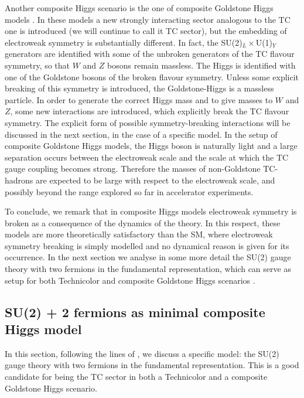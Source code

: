 Another composite Higgs scenario is the one of composite Goldstone Higgs models \cite{Kaplan:1983sm,Kaplan:1983fs}. In these models a new strongly interacting sector analogous to the TC one is introduced (we will continue to call it TC sector), but the embedding of electroweak symmetry is substantially different. In fact, the SU(2)$_L\times$U(1)$_Y$ generators are identified with some of the unbroken generators of the TC flavour symmetry, so that $W$ and $Z$ bosons remain massless. The Higgs is identified with one of the Goldstone bosons of the broken flavour symmetry. Unless some explicit breaking of this symmetry is introduced, the Goldstone-Higgs is a massless particle. In order to generate the correct Higgs mass and to give masses to $W$ and $Z$, some new interactions are introduced, which explicitly break the TC flavour symmetry. The explicit form of possible symmetry-breaking interactions will be discussed in the next section, in the case of a specific model. In the setup of composite Goldstone Higgs models, the Higgs boson is naturally light and a large separation occurs between the electroweak scale and the scale at which the TC gauge coupling becomes strong. Therefore the masses of non-Goldstone TC-hadrons are expected to be large with respect to the electroweak scale, and possibly beyond the range explored so far in accelerator experiments.

To conclude, we remark that in composite Higgs models electroweak symmetry is broken as a consequence of the dynamics of the theory. In this respect, these models are more theoretically satisfactory than the SM, where electroweak symmetry breaking is simply modelled and no dynamical reason is given for its occurrence. In the next section we analyse in some more detail the SU(2) gauge theory with two fermions in the fundamental representation, which can serve as setup for both Technicolor and composite Goldstone Higgs scenarios \cite{Cacciapaglia:2014uja}.


\subsection{SU(2) + 2 fermions as minimal composite Higgs model}
\label{SU2_composite_Higgs}

In this section, following the lines of \cite{Cacciapaglia:2014uja}, we discuss a specific model: the SU(2) gauge theory with two fermions in the fundamental representation. This is a good candidate for being the TC sector in both a Technicolor and a composite Goldstone Higgs scenario.

